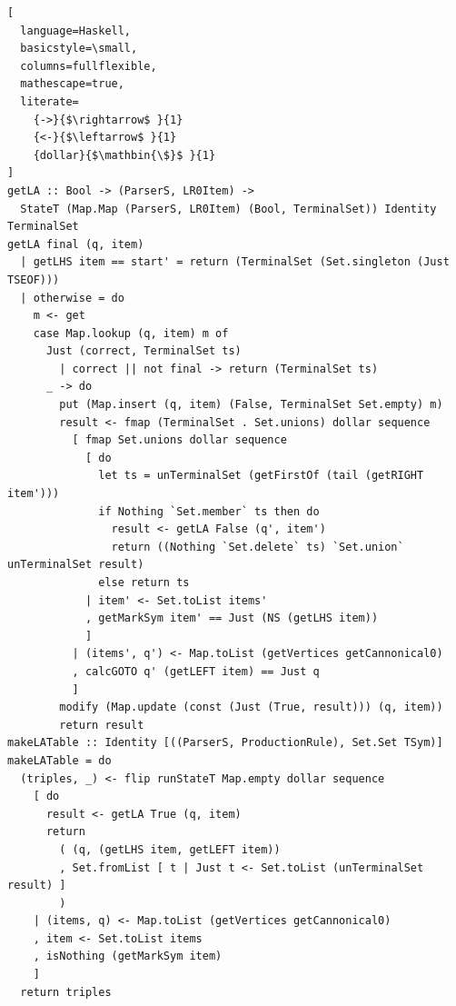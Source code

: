 \documentclass[12pt]{paper}
\theoremstyle{definition}
\begin{document}
\begin{lstlisting}[
  language=Haskell,
  basicstyle=\small,
  columns=fullflexible,
  mathescape=true,
  literate=
    {->}{$\rightarrow$ }{1}
    {<-}{$\leftarrow$ }{1}
    {dollar}{$\mathbin{\$}$ }{1}
]
getLA :: Bool -> (ParserS, LR0Item) ->
  StateT (Map.Map (ParserS, LR0Item) (Bool, TerminalSet)) Identity TerminalSet
getLA final (q, item)
  | getLHS item == start' = return (TerminalSet (Set.singleton (Just TSEOF)))
  | otherwise = do
    m <- get
    case Map.lookup (q, item) m of
      Just (correct, TerminalSet ts)
        | correct || not final -> return (TerminalSet ts)
      _ -> do
        put (Map.insert (q, item) (False, TerminalSet Set.empty) m)
        result <- fmap (TerminalSet . Set.unions) dollar sequence
          [ fmap Set.unions dollar sequence
            [ do
              let ts = unTerminalSet (getFirstOf (tail (getRIGHT item')))
              if Nothing `Set.member` ts then do
                result <- getLA False (q', item')
                return ((Nothing `Set.delete` ts) `Set.union` unTerminalSet result)
              else return ts
            | item' <- Set.toList items'
            , getMarkSym item' == Just (NS (getLHS item))
            ]
          | (items', q') <- Map.toList (getVertices getCannonical0)
          , calcGOTO q' (getLEFT item) == Just q
          ]
        modify (Map.update (const (Just (True, result))) (q, item))
        return result
makeLATable :: Identity [((ParserS, ProductionRule), Set.Set TSym)]
makeLATable = do
  (triples, _) <- flip runStateT Map.empty dollar sequence
    [ do
      result <- getLA True (q, item)
      return
        ( (q, (getLHS item, getLEFT item))
        , Set.fromList [ t | Just t <- Set.toList (unTerminalSet result) ]
        )
    | (items, q) <- Map.toList (getVertices getCannonical0)
    , item <- Set.toList items
    , isNothing (getMarkSym item)
    ]
  return triples
\end{lstlisting}
\end{document}
